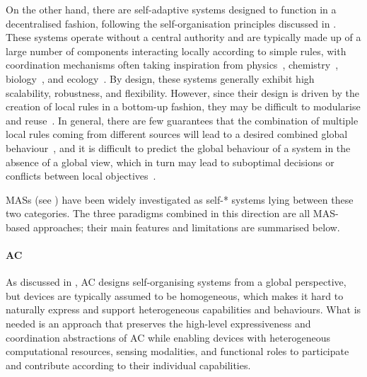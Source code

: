 On the other hand,
there are self-adaptive systems designed to function in a decentralised fashion,
following the self-organisation principles discussed in .
%
These systems operate without a central authority
and
are typically made up of a large number of components
interacting locally according to simple rules,
with coordination mechanisms often taking inspiration from
physics~\cite{DBLP:journals/tosem/MameiZ09,viroli2019jlap},
chemistry~\cite{DBLP:conf/coordination/ViroliC09},
biology~\cite{schranz2021swevo},
and ecology~\cite{zambonelli2015percom,DBLP:journals/nc/BriscoeSW11}.
%
By design,
these systems generally exhibit high
scalability, robustness, and flexibility.
%
However,
since their design is driven by the creation of local rules
in a bottom-up fashion,
they may be difficult to modularise and reuse~\cite{DBLP:conf/icse/BozhinoskiB18}.
%
In general,
there are few guarantees that the combination of multiple local rules
coming from different sources will lead to a desired combined global behaviour~\cite{DBLP:journals/swarm/ReinaMDT15},
and
it is difficult to predict the global behaviour of a system in the absence of a global view,
which in turn may lead to suboptimal decisions
or conflicts between local objectives~\cite{DBLP:journals/firai/Kuckling23,DBLP:journals/firai/RoliLB19}.

\acp{MAS} (see )
have been widely investigated as self-* systems
lying between these two categories.
%
The three paradigms combined in this direction are all \ac{MAS}-based approaches;
their main features and limitations are summarised below.

\paragraph{\acl{AC}}
As discussed in ,
\ac{AC} designs self-organising systems from a global perspective,
but devices are typically assumed to be homogeneous,
which makes it hard to naturally express and support heterogeneous capabilities and behaviours.
%
What is needed is an approach that
preserves the high-level expressiveness and coordination abstractions of \ac{AC}
while
enabling devices with
heterogeneous computational resources,
sensing modalities,
and functional roles
to
participate and contribute according to their individual capabilities.

